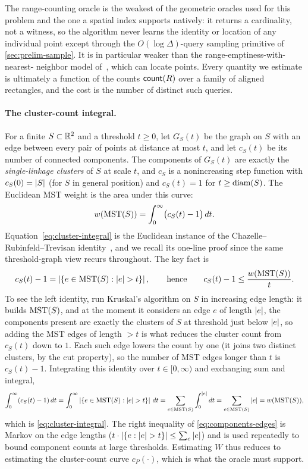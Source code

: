 The range-counting oracle is the weakest of the geometric oracles used for this problem and the one a
spatial index supports natively: it returns a cardinality, not a witness, so the algorithm never learns
the identity or location of any individual point except through the $O(\log\Delta)$-query sampling
primitive of \cref{sec:prelim-sample}. It is in particular weaker than the range-emptiness-with-nearest-
neighbor model of~\cite{Czumaj05}, which can locate points. Every quantity we estimate is ultimately a
function of the counts $\mathsf{count}(R)$ over a family of aligned rectangles, and the cost is the number of
distinct such queries.

\paragraph{The cluster-count integral.}
For a finite $S\subset\mathbb{R}^2$ and a threshold $t\ge 0$, let $G_S(t)$ be the graph on $S$ with an edge
between every pair of points at distance at most $t$, and let $c_S(t)$ be its number of connected
components. The components of $G_S(t)$ are exactly the \emph{single-linkage clusters} of $S$ at scale
$t$, and $c_S$ is a nonincreasing step function with $c_S(0)=\left|S\right|$ (for $S$ in general position) and
$c_S(t)=1$ for $t\ge\operatorname{diam}(S)$. The Euclidean MST weight is the area under this curve:
\begin{equation}\label{eq:cluster-integral}
  w(\mathrm{MST}(S))=\int_0^\infty\bigl(c_S(t)-1\bigr)\,dt .
\end{equation}
Equation~\eqref{eq:cluster-integral} is the Euclidean instance of the Chazelle--Rubinfeld--Trevisan
identity~\cite{CRT05}, and we recall its one-line proof since the same threshold-graph view recurs
throughout. The key fact is
\begin{equation}\label{eq:components-edges}
  c_S(t)-1=\abs{\set{e\in\MST(S):\abs{e}>t}},\qquad\text{hence}\qquad c_S(t)-1\le \frac{\wt(\MST(S))}{t}.
\end{equation}
To see the left identity, run Kruskal's algorithm on $S$ in increasing edge length: it builds $\mathrm{MST}(S)$,
and at the moment it considers an edge $e$ of length $\left|e\right|$, the components present are exactly the
clusters of $S$ at threshold just below $\left|e\right|$, so adding the MST edges of length $>t$ is what reduces
the cluster count from $c_S(t)$ down to $1$. Each such edge lowers the count by one (it joins two distinct
clusters, by the cut property), so the number of MST edges longer than $t$ is $c_S(t)-1$. Integrating this
identity over $t\in[0,\infty)$ and exchanging sum and integral,
\[
  \int_0^\infty(c_S(t)-1)\,dt=\int_0^\infty\abs{\set{e\in\MST(S):\abs e>t}}\,dt
   =\sum_{e\in\MST(S)}\int_0^{\abs e}dt=\sum_{e\in\MST(S)}\abs e=\wt(\MST(S)),
\]
which is \eqref{eq:cluster-integral}. The right inequality of \eqref{eq:components-edges} is Markov on the
edge lengths ($t\cdot\abs{\{e:\abs e>t\}}\le\sum_e\abs e$) and is used repeatedly to bound component counts
at large thresholds. Estimating $W$ thus reduces to estimating the cluster-count curve $c_P(\cdot)$, which
is what the oracle must support.


